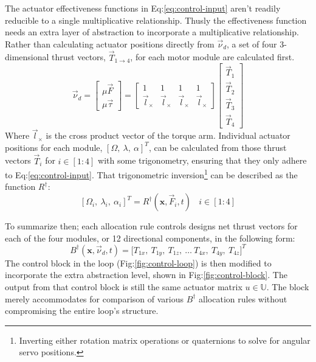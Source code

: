 \par
The actuator effectiveness functions in Eq:\ref{eq:control-input} aren't readily reducible to a single multiplicative relationship. Thusly the effectiveness function needs an extra layer of abstraction to incorporate a multiplicative relationship. Rather than calculating actuator positions directly from $\vec{\nu}_d$, a set of four 3-dimensional thrust vectors, $\vec{T}_{1\rightarrow 4}$, for each motor module are calculated first.
\begin{equation}\label{eq:4.7}
\vec{\nu}_d=\begin{bmatrix}
\mu\vec{F}\\
\mu\vec{\tau}
\end{bmatrix}
= 
\begin{bmatrix}
1 & 1 & 1 & 1\\
\vec{l}_\times & \vec{l}_\times & \vec{l}_\times & \vec{l}_\times
\end{bmatrix}
\begin{bmatrix}
\vec{T}_1\\
\vec{T}_2\\
\vec{T}_3\\
\vec{T}_4
\end{bmatrix}
\end{equation}
Where $\vec{l}_\times$ is the cross product vector of the torque arm. Individual actuator positions for each module, $[\Omega,~\lambda,~\alpha]^T$, can be calculated from those thrust vectors $\vec{T}_i$ for $i\in[1:4]$ with some trigonometry, ensuring that they only adhere to Eq:\ref{eq:control-input}. That trigonometric inversion\footnote{Inverting either rotation matrix operations or quaternions to solve for angular servo positions.} can be described as the function $R^\dagger$:
\begin{equation}\label{eq:4.8}
[\Omega_i,~\lambda_i,~\alpha_i]^T=R^\dagger(\mathbf{x},\vec{F}_i,t)~~~~i\in[1:4]
\end{equation}
\par
To summarize then; each allocation rule controls designs net thrust vectors for each of the four modules, or 12 directional components, in the following form:
\begin{equation}
B^{\dagger}(\mathbf{x},\vec{\nu}_d,t)=\big[ T_{1x},~T_{1y},~T_{1z},~\ldots~T_{4x},~T_{4y},~T_{4z}\big]^T
\end{equation}
The control block in the loop (Fig:\ref{fig:control-loop}) is then modified to incorporate the extra abstraction level, shown in Fig:\ref{fig:control-block}. The output from that control block is still the same actuator matrix $u\in\mathbb{U}$. The block merely accommodates for comparison of various $B^\dagger$ allocation rules without compromising the entire loop's structure.
